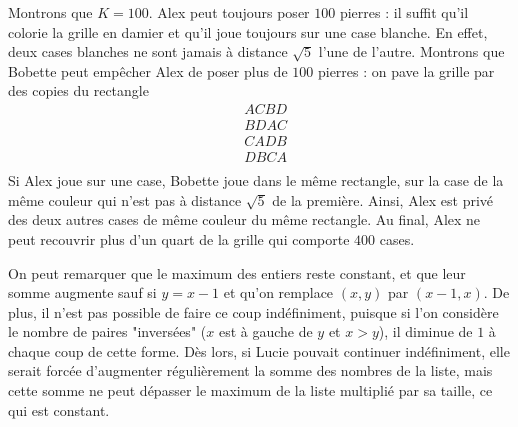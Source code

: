 \begin{sol}
Montrons que $K=100$. Alex peut toujours poser $100$ pierres : il suffit qu'il colorie la grille en damier et qu'il joue toujours sur une case blanche. En effet, deux cases blanches ne sont jamais à distance $\sqrt5$ l'une de l'autre. Montrons que Bobette peut empêcher Alex de poser plus de $100$ pierres : on pave la grille par des copies du rectangle
\begin{align*}
&ACBD\\
&BDAC\\
&CADB\\
&DBCA\\
\end{align*}
Si Alex joue sur une case, Bobette joue dans le même rectangle, sur la case de la même couleur qui n'est pas à distance $\sqrt5$ de la première. Ainsi, Alex est privé des deux autres cases de même couleur du même rectangle. Au final, Alex ne peut recouvrir plus d'un quart de la grille qui comporte $400$ cases.
\end{sol}

\begin{sol}
On peut remarquer que le maximum des entiers reste constant, et que leur somme augmente sauf si $y=x-1$ et qu'on remplace $(x,y)$ par $(x-1,x)$. De plus, il n'est pas possible de faire ce coup indéfiniment, puisque si l'on considère le nombre de paires "inversées" ($x$ est à gauche de $y$ et $x>y$), il diminue de $1$ à chaque coup de cette forme. Dès lors, si Lucie pouvait continuer indéfiniment, elle serait forcée d'augmenter régulièrement la somme des nombres de la liste, mais cette somme ne peut dépasser le maximum de la liste multiplié par sa taille, ce qui est constant.
\end{sol}

